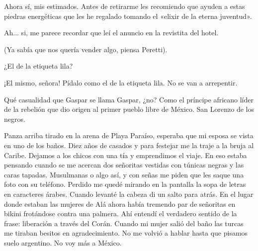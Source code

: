 \documentclass[12pt,twoside,openright,a5paper]{book}
\begin{document}
\vspace{0.5cm}

\hrulefill\hspace{0.2cm} \decofourleft\decofourright \hspace{0.2cm} \hrulefill
\vspace{0.5cm}

Ahora sí, mis estimados. Antes de retirarme les recomiendo que ayuden a
estas piedras energéticas que les he regalado tomando el «elixir de la
eterna juventud».

Ah... si, me parece recordar que leí el anuncio en la revistita del hotel.

(Ya sabía que nos quería vender algo, piensa Peretti).

¿El de la etiqueta lila?

¡El mismo, señora! Pídalo como el de la etiqueta lila. No se van a
arrepentir.

\vspace{0.5cm}

\hrulefill\hspace{0.2cm} \decofourleft\decofourright \hspace{0.2cm} \hrulefill
\vspace{0.5cm}

Qué casualidad que Gaspar se llama Gaspar, ¿no? Como el príncipe africano
líder de la rebelión que dio origen al primer pueblo libre de México. San
Lorenzo de los negros.

\vspace{0.5cm}

\hrulefill\hspace{0.2cm} \decofourleft\decofourright \hspace{0.2cm} \hrulefill
\vspace{0.5cm}

Panza arriba tirado en la arena de Playa Paraíso, esperaba que mi esposa se
vista en uno de los baños. Diez años de casados y para festejar me la traje
a la bruja al Caribe. Dejamos a los chicos con una tía y emprendimos el
viaje. En eso estaba pensando cuando se me acercan dos señoritas vestidas
con túnicas negras y las caras tapadas. Musulmanas o algo así, y con
señas me piden que les saque una foto con su teléfono. Perdido me quedé
mirando en la pantalla la sopa de letras en caracteres árabes. Cuando levanté
la cabeza di un salto para atrás. En el lugar donde estaban las mujeres de
Alá ahora había tremendo par de señoritas en bikini frotándose contra
una palmera. Ahí entendí el verdadero sentido de la frase: liberación a
través del Corán. Cuando mi mujer salió del baño las turcas me tiraban
besitos en agradecimiento. No me volvió a hablar hasta que pisamos suelo
argentino. No voy más a México.
\end{document}
